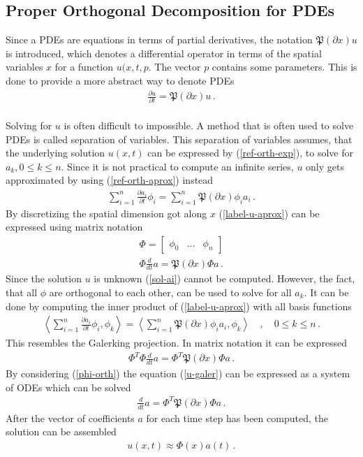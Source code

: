 \subsection{Proper Orthogonal Decomposition for PDEs}
Since a PDEs are equations in terms of partial derivatives, the notation \(\mathfrak{P}(\partial x) u\) is introduced, which denotes a differential operator in terms of the spatial variables \(x\) for a function \(u(x,t,p\).
The vector \(p\) contains some parameters.
This is done to provide a more abstract way to denote PDEs
\begin{gather}
\frac{\partial u}{\partial t} = \mathfrak{P}(\partial x) u \,.
\end{gather}
\cite{Gustafsson2011f} \\
Solving for \(u\) is often difficult to impossible.
A method that is often used to solve PDEs is called separation of variables.
This separation of variables assumes, that the underlying solution \(u(x, t)\) can be expressed by (\ref{ref-orth-exp}), to solve for \(a_k, 0 \leq k \leq n\).
Since it is not practical to compute an infinite series, \(u\) only gets approximated by using (\ref{ref-orth-aprox}) instead
\begin{gather}
\sum_{i = 1} ^{n} \frac{\partial a_i}{\partial t} \phi_i = \sum_{i = 1} ^{n} \mathfrak{P}(\partial x) \phi_i a_i \,. \label{label-u-aprox} 
\end{gather}
By discretizing the spatial dimension got along \(x\) (\ref{label-u-aprox}) can be expressed using matrix notation
\begin{gather}
\Phi = \begin{bmatrix}
\phi_0 & ... & \phi_n
\end{bmatrix} \label{mat-phi}\\
\Phi \frac{d}{dt}a = \mathfrak{P}(\partial x) \Phi a \,.
\end{gather}
Since the solution \(u\) is unknown (\ref{sol-ai}) cannot be computed.
However, the fact, that all \(\phi\) are orthogonal to each other, can be used to solve for all \(a_k\).
It can be done by computing the inner product of (\ref{label-u-aprox}) with all basis functions
\begin{gather}
\left\langle \sum_{i = 1} ^{n} \frac{\partial a_i}{\partial t} \phi_i, \phi_k \right\rangle = \left\langle\sum_{i = 1} ^{n} \mathfrak{P}(\partial x) \phi_i a_i, \phi_k \right\rangle \quad, \quad 0 \leq k \leq n \,. \label{u-galer}
\end{gather}
This resembles the Galerking projection.
In matrix notation it can be expressed
\begin{gather}
\Phi^{T}\Phi \frac{d}{dt}a = \Phi^{T}\mathfrak{P}(\partial x) \Phi a \,.
\end{gather}
By considering (\ref{phi-orth})  the equation (\ref{u-galer}) can be expressed as a system of ODEs which can be solved
\begin{gather}
\frac{d}{dt} a = \Phi^{T}\mathfrak{P}(\partial x) \Phi a \,.
\end{gather}
After the vector of coefficients \(a\) for each time step has been computed, the solution can be assembled \cite{brunton_kutz_2019c}
\begin{gather}
u(x, t) \approx \Phi(x)a(t) \,. \label{u-aprox-pod}
\end{gather} 
